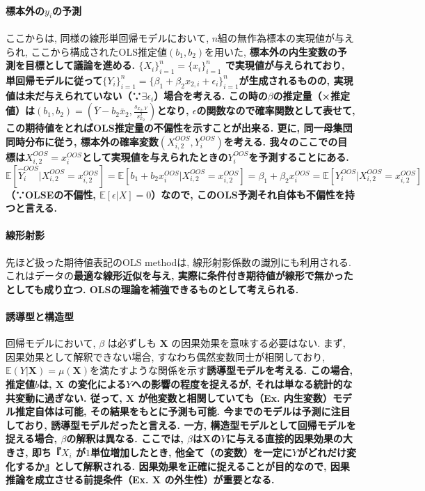 \documentclass[paper=a4paper,fontsize=10pt]{jlreq}
\begin{document}
\paragraph{標本外の$y_i$の予測}
ここからは, 同様の線形単回帰モデルにおいて, $n$組の無作為標本の実現値が与えられ, ここから構成されたOLS推定値$(b_1, b_2)$を用いた, \rmfamily\mcfamily\bfseries{標本外}\mdseries の内生変数の予測を目標として議論を進める. $\{X_i\}_{i=1}^{n}=\{x_i\}_{i=1}^{n}$ で実現値が与えられており, 単回帰モデルに従って$\{Y_i\}_{i=1}^{n}=\{\beta_1+\beta_2x_{2,i}+\epsilon_i\}_{i=1}^{n}$が生成されるものの, 実現値は未だ与えられていない（∵$\exists\epsilon_i$）場合を考える. この時の$\beta$の推定量（×推定値）は$(b_1, b_2)=(\bar{Y}-b_2\bar{x}_2, \frac{s_{x_2,Y}}{s^{2}_{x_2}})$となり, $\epsilon$の関数なので確率関数として表せて, この期待値をとればOLS推定量の不偏性を示すことが出来る. 更に, 同一母集団同時分布に従う, 標本外の確率変数$(X_{i,2}^{OOS}, Y_i^{OOS})$を考える. 我々のここでの目標は$X_{i,2}^{OOS}=x_i^{OOS}$として実現値を与えられたときの$Y_i^{OOS}$を予測することにある. $\mathbb{E}[\hat{Y}_i^{OOS}|X_{i,2}^{OOS}=x_{i,2}^{OOS}]=\mathbb{E}[b_1+b_2x_i^{OOS}|X_{i,2}^{OOS}=x_{i,2}^{OOS}]=\beta_1+\beta_2x_i^{OOS}=\mathbb{E}[Y_i^{OOS}|X_{i,2}^{OOS}=x_{i,2}^{OOS}]$（∵OLSEの不偏性, $\mathbb{E}[\epsilon|X]=0$）なので, \rmfamily\mcfamily\bfseries{このOLS予測それ自体も不偏性を持つ}\mdseries と言える.\\

\paragraph{線形射影}
先ほど扱った期待値表記のOLS methodは, 線形射影係数の識別にも利用される. これはデータの\rmfamily\mcfamily\bfseries{最適な線形近似}\mdseries を与え, 実際に条件付き期待値が線形で無かったとしても成り立つ. OLSの理論を補強できるものとして考えられる. \\


\paragraph{誘導型と構造型}
回帰モデルにおいて, $\beta$ は必ずしも $\mathbf{X}$ の因果効果を意味する必要はない. まず, 因果効果として解釈できない場合, すなわち偶然変数同士が相関しており, $\mathbb{E}(Y|\mathbf{X})=\mu(\mathbf{X})$を満たすような関係を示す\rmfamily\mcfamily\bfseries{誘導型モデル}\mdseries を考える. この場合, 推定値$b$は, $\mathbf{X}$ の変化による$Y$への影響の程度を捉えるが, それは単なる統計的な共変動に過ぎない. 従って, $\mathbf{X}$ が他変数と相関していても（Ex. 内生変数）\rmfamily\mcfamily\bfseries{モデル推定自体は可能}\mdseries , その結果をもとに\rmfamily\mcfamily\bfseries{予測も可能}\mdseries . 今までのモデルは予測に注目しており, 誘導型モデルだったと言える. 一方, \rmfamily\mcfamily\bfseries{構造型モデル}\mdseries として回帰モデルを捉える場合, $\beta$の解釈は異なる. ここでは, $\beta$は$\mathbf{X}$の$Y$に与える\rmfamily\mcfamily\bfseries{直接的因果効果}\mdseries の大きさ, 即ち『$X_{i}$ が$1$単位増加したとき, 他全て（の変数）を一定に$Y$がどれだけ変化するか』として解釈される. 因果効果を正確に捉えることが目的なので, 因果推論を成立させる前提条件（Ex. $\mathbf{X}$ の外生性）が重要となる.\\
\end{document}
